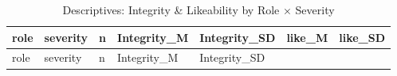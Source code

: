 \documentclass[
]{article}
\begin{document}
\begin{longtable}[]{@{}
  >{\raggedright\arraybackslash}p{}
  >{\raggedright\arraybackslash}p{}
  >{\raggedleft\arraybackslash}p{}
  >{\raggedleft\arraybackslash}p{}
  >{\raggedleft\arraybackslash}p{}
  >{\raggedleft\arraybackslash}p{}
  >{\raggedleft\arraybackslash}p{}@{}}
\caption{Descriptives: Integrity \& Likeability by Role ×
Severity}\tabularnewline
\toprule\noalign{}
\begin{minipage}[b]{\linewidth}\raggedright
role
\end{minipage} & \begin{minipage}[b]{\linewidth}\raggedright
severity
\end{minipage} & \begin{minipage}[b]{\linewidth}\raggedleft
n
\end{minipage} & \begin{minipage}[b]{\linewidth}\raggedleft
Integrity\_M
\end{minipage} & \begin{minipage}[b]{\linewidth}\raggedleft
Integrity\_SD
\end{minipage} & \begin{minipage}[b]{\linewidth}\raggedleft
like\_M
\end{minipage} & \begin{minipage}[b]{\linewidth}\raggedleft
like\_SD
\end{minipage} \\
\midrule\noalign{}
\endfirsthead
\toprule\noalign{}
\begin{minipage}[b]{\linewidth}\raggedright
role
\end{minipage} & \begin{minipage}[b]{\linewidth}\raggedright
severity
\end{minipage} & \begin{minipage}[b]{\linewidth}\raggedleft
n
\end{minipage} & \begin{minipage}[b]{\linewidth}\raggedleft
Integrity\_M
\end{minipage} & \begin{minipage}[b]{\linewidth}\raggedleft
Integrity\_SD
\end{minipage} & \begin{minipage}[b]{\linewidth}\raggedleft

\end{minipage}
\end{longtable}
\end{document}
